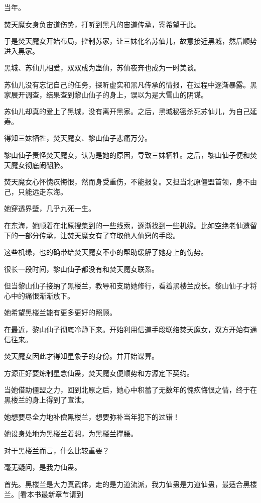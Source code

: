 
\begin{this_body}

当年。

焚天魔女身负宙道伤势，打听到黑凡的宙道传承，寄希望于此。

于是焚天魔女开始布局，控制苏家，让三妹化名苏仙儿，故意接近黑城，然后顺势进入黑家。

黑城、苏仙儿相爱，双双成为蛊仙，苏仙夜奔也成为一时美谈。

苏仙儿没有忘记自己的任务，探听虚实和黑凡传承的情报，在过程中逐渐暴露。黑家展开调查，结果查到黎山仙子的身上，误以为是大雪山的阴谋。

苏仙儿却真的爱上了黑城，没有离开黑家。之后，黑城秘密杀死苏仙儿，为自己延寿。

得知三妹牺牲，焚天魔女、黎山仙子悲痛万分。

黎山仙子责怪焚天魔女，认为是她的原因，导致三妹牺牲。之后，黎山仙子便和焚天魔女彻底闹翻脸。

焚天魔女心怀愧疚悔恨，然而身受重伤，不能报复。又担当北原僵盟首领，身不由己，只能远走东海。

她穿透界壁，几乎九死一生。

在东海，她顺着在北原搜集到的一些线索，逐渐找到一些机缘。比如空绝老仙遗留下的一部分传承，让焚天魔女有了夺取他人仙窍的手段。

这些机缘，也的确带给焚天魔女不小的帮助缓解了她身上的伤势。

很长一段时间，黎山仙子都没有和焚天魔女联系。

但当黎山仙子接纳了黑楼兰，教导和支助她修行，看着黑楼兰成长。黎山仙子才将心中的痛恨渐渐放下。

她希望黑楼兰能有更多更好的照顾。

在最近，黎山仙子彻底冷静下来。开始利用信道手段联络焚天魔女，双方开始有通信往来。

焚天魔女因此才得知星象子的身份。并开始谋算。

方源正好要炼制星念仙蛊，焚天魔女便顺势和方源定下契约。

当她借助僵盟之力，回到北原之后，她心中积蓄了无数年的愧疚悔恨之情，终于在黑楼兰的身上得到了宣泄。

她想要尽全力地补偿黑楼兰，想要弥补当年犯下的过错！

她设身处地为黑楼兰着想，为黑楼兰撑腰。

对于黑楼兰而言，什么比较重要？

毫无疑问，是我力仙蛊。

首先。黑楼兰是大力真武体，走的是力道流派，我力仙蛊是力道仙蛊，最适合黑楼兰。[看本书最新章节请到


\end{this_body}
